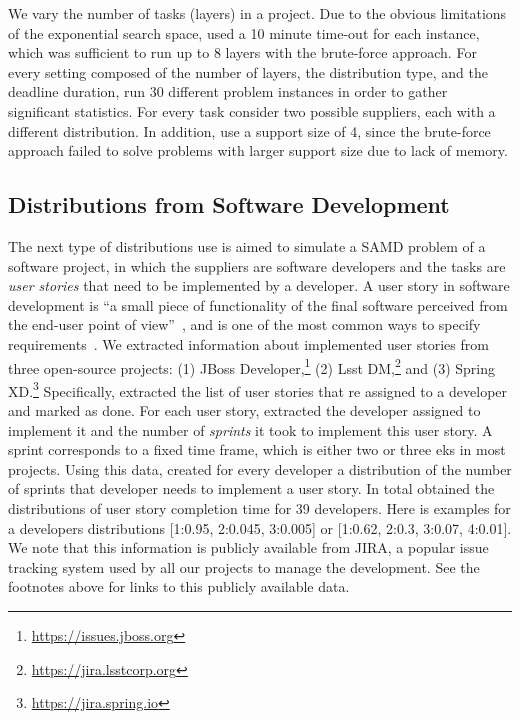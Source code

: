 \documentclass[letterpaper]{article} %
\newcommand{\samd}{\ac{SAMD}\xspace}
\newcommand\Roni[1]{\nb{\textbf{Roni:}}{blue}{#1}}
\begin{document}

We vary the number of tasks (layers) in a project. Due to the obvious limitations of the exponential search space,  used a 10 minute time-out for each instance, which was sufficient to run up to 8 layers with the brute-force approach. For every setting composed of the number of layers, the distribution type, and the deadline duration,  run 30 different problem instances in order to gather significant statistics. For every task  consider two possible suppliers, each with a different distribution. In addition,  use a support size of 4, since the brute-force approach failed to solve problems with larger support size due to lack of memory.

\subsection{Distributions from Software Development}
The next type of distributions  use is aimed to simulate a \samd problem of a software project, in which the suppliers are software developers and the tasks are \emph{user stories} that need to be implemented by a developer. A user story in software development is ``a small piece of functionality of the final software perceived from the end-user point of view''~\cite{rees2002feasible},
and is one of the most common ways to specify requirements~\cite{kassab2015changing}. We extracted information about implemented user stories from three open-source projects: (1) JBoss Developer,\footnote{\url{https://issues.jboss.org}} (2) Lsst DM,\footnote{\url{https://jira.lsstcorp.org}} and (3) Spring XD.\footnote{\url{https://jira.spring.io}}
Specifically,  extracted the list of user stories that re assigned to a developer and marked as done. For each user story,  extracted the developer assigned to implement it and the number of \emph{sprints} it took to implement this user story. A sprint corresponds to a fixed time frame, which is either two or three eks in most projects. Using this data,  created for every developer a distribution of the number of sprints that developer needs to implement a user story. In total  obtained the distributions of user story completion time for 39 developers. Here is examples for a developers distributions [1:0.95,	2:0.045, 3:0.005] or [1:0.62,	2:0.3,	3:0.07,	4:0.01].
We note that this information is publicly available from JIRA, a popular issue tracking system used by all our projects to manage the development. See the footnotes above for links to this publicly available data.
\end{document}
